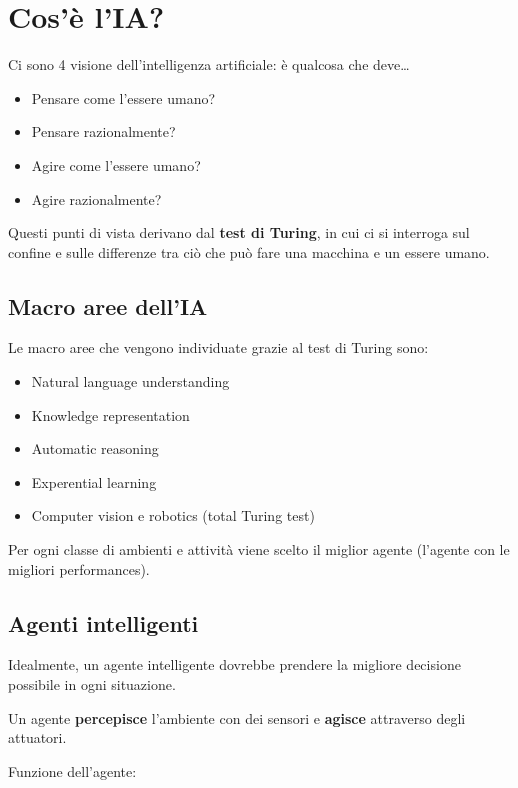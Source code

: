 \newpage

\section{Cos'è l'IA?}

Ci sono 4 visione dell'intelligenza artificiale: è qualcosa che deve\dots

\begin{itemize}
 \item Pensare come l'essere umano?
 \item Pensare razionalmente?
 \item Agire come l'essere umano?
 \item Agire razionalmente?
\end{itemize}

Questi punti di vista derivano dal \textbf{test di Turing}, in cui ci si
interroga sul confine e sulle differenze tra ciò che può fare una macchina
e un essere umano.

\subsection{Macro aree dell'IA}

Le macro aree che vengono individuate grazie al test di Turing sono:

\begin{itemize}
 \item Natural language understanding
 \item Knowledge representation
 \item Automatic reasoning
 \item Experential learning
 \item Computer vision e robotics (total Turing test)
\end{itemize}

Per ogni classe di ambienti e attività viene scelto il miglior agente (l'agente
con le migliori performances).

\subsection{Agenti intelligenti}

Idealmente, un agente intelligente dovrebbe prendere la migliore decisione
possibile in ogni situazione.

Un agente \textbf{percepisce} l'ambiente con dei sensori e \textbf{agisce}
attraverso degli attuatori.

Funzione dell'agente:


